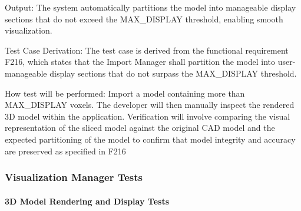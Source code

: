 \documentclass[12pt, titlepage]{article}
\begin{document}
\begin{enumerate}
Output: The system automatically partitions the model into manageable display sections that do not exceed the MAX\_DISPLAY threshold, enabling smooth visualization.

Test Case Derivation: The test case is derived from the functional requirement F216, which states that the Import Manager shall partition the model into user-manageable display sections that do not surpass the MAX\_DISPLAY threshold.
					
How test will be performed: Import a model containing more than MAX\_DISPLAY voxels. The developer will then manually inspect the rendered 3D model within the application. Verification will involve comparing the visual representation of the sliced model against the original CAD model and the expected partitioning of the model to confirm that model integrity and accuracy are preserved as specified in F216

\end{enumerate}

\subsubsection{Visualization Manager Tests}

\paragraph{3D Model Rendering and Display Tests}
\end{document}
